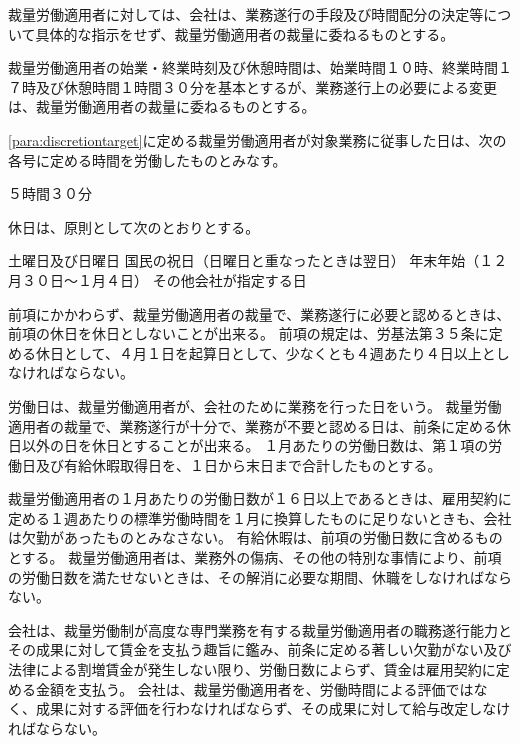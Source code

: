 \documentclass[10pt,a4paper,uplatex]{jsarticle}
\begin{document}
裁量労働適用者に対しては、会社は、業務遂行の手段及び時間配分の決定等について具体的な指示をせず、裁量労働適用者の裁量に委ねるものとする。

裁量労働適用者の始業・終業時刻及び休憩時間は、始業時間１０時、終業時間１７時及び休憩時間１時間３０分を基本とするが、業務遂行上の必要による変更は、裁量労働適用者の裁量に委ねるものとする。

\label{para:discretiontargetworktime}
\ref{para:discretiontarget}に定める裁量労働適用者が対象業務に従事した日は、次の各号に定める時間を労働したものとみなす。
\begin{enumerate}
    \itm ５時間３０分
\end{enumerate}

休日は、原則として次のとおりとする。
\begin{enumerate}
    \itm 土曜日及び日曜日
    \itm 国民の祝日（日曜日と重なったときは翌日）
    \itm 年末年始（１２月３０日〜１月４日）
    \itm その他会社が指定する日
\end{enumerate}
\term 前項にかかわらず、裁量労働適用者の裁量で、業務遂行に必要と認めるときは、前項の休日を休日としないことが出来る。
\term 前項の規定は、労基法第３５条に定める休日として、４月１日を起算日として、少なくとも４週あたり４日以上としなければならない。

労働日は、裁量労働適用者が、会社のために業務を行った日をいう。
\term 裁量労働適用者の裁量で、業務遂行が十分で、業務が不要と認める日は、前条に定める休日以外の日を休日とすることが出来る。
\term １月あたりの労働日数は、第１項の労働日及び有給休暇取得日を、１日から末日まで合計したものとする。

裁量労働適用者の１月あたりの労働日数が１６日以上であるときは、雇用契約に定める１週あたりの標準労働時間を１月に換算したものに足りないときも、会社は欠勤があったものとみなさない。
\term 有給休暇は、前項の労働日数に含めるものとする。
\term 裁量労働適用者は、業務外の傷病、その他の特別な事情により、前項の労働日数を満たせないときは、その解消に必要な期間、休職をしなければならない。

会社は、裁量労働制が高度な専門業務を有する裁量労働適用者の職務遂行能力とその成果に対して賃金を支払う趣旨に鑑み、前条に定める著しい欠勤がない及び法律による割増賃金が発生しない限り、労働日数によらず、賃金は雇用契約に定める金額を支払う。
\term 会社は、裁量労働適用者を、労働時間による評価ではなく、成果に対する評価を行わなければならず、その成果に対して給与改定しなければならない。
\end{document}
